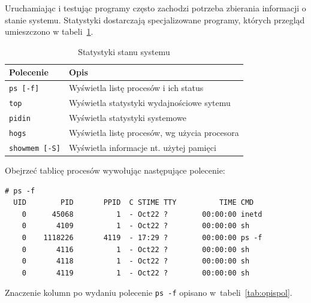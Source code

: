 \begin{example}

Uruchamiając i testując programy często zachodzi potrzeba zbierania informacji o stanie systemu. Statystyki dostarczają specjalizowane programy, których przegląd umieszczono w tabeli~\ref{tab:statystyki}.

\begin{table}[h!]
\centering
\caption{Statystyki stanu systemu}
\setlength{\arrayrulewidth}{1pt}
\setlength{\tabcolsep}{6pt}
\renewcommand{\arraystretch}{1.2}
\begin{tabular}{ |p{}|p{}|}
\hline \rowcolor{gray}
\textbf{Polecenie} & \textbf{Opis} \\ \hline
\mbox{\lstinline[style=MyBashStyle]{ps [-f]}} & Wyświetla listę procesów i ich status \\ \hline
\mbox{\lstinline[style=MyBashStyle]{top}} & Wyświetla statystyki wydajnościowe sytemu \\ \hline
\mbox{\lstinline[style=MyBashStyle]{pidin}}  & Wyświetla statystyki systemowe \\ \hline
\mbox{\lstinline[style=MyBashStyle]{hogs}}  & Wyświetla listę procesów, wg użycia procesora \\ \hline
\mbox{\lstinline[style=MyBashStyle]{showmem [-S]}}  & Wyświetla informacje nt. użytej pamięci \\ \hline
\end{tabular}
\label{tab:statystyki}
\end{table}

Obejrzeć tablicę procesów wywołując następujące polecenie:
\begin{lstlisting}[style=MyBashStyle,deletekeywords={ps}]
# ps -f
  UID        PID       PPID  C STIME TTY          TIME CMD
    0      45068          1  - Oct22 ?        00:00:00 inetd
    0       4109          1  - Oct22 ?        00:00:00 sh
    0    1118226       4119  - 17:29 ?        00:00:00 ps -f
    0       4116          1  - Oct22 ?        00:00:00 sh
    0       4118          1  - Oct22 ?        00:00:00 sh
    0       4119          1  - Oct22 ?        00:00:00 sh
\end{lstlisting}

Znaczenie kolumn po wydaniu polecenie \lstinline[style=MyBashStyle]{ps -f} opisano w~tabeli~\ref{tab:opispol}.


\end{example}
